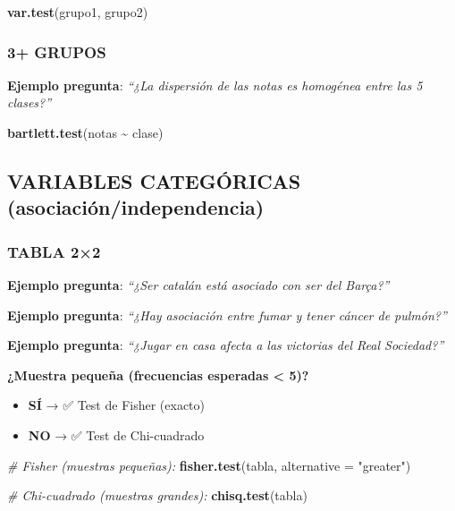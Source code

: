\documentclass[
  10pt,
]{article}
\newenvironment{Shaded}{\begin{snugshade}}{\end{snugshade}}
\newcommand{\AttributeTok}[1]{\textcolor[rgb]{0.13,0.29,0.53}{#1}}
\newcommand{\CommentTok}[1]{\textcolor[rgb]{0.56,0.35,0.01}{\textit{#1}}}
\newcommand{\FunctionTok}[1]{\textcolor[rgb]{0.13,0.29,0.53}{\textbf{#1}}}
\newcommand{\NormalTok}[1]{#1}
\newcommand{\SpecialCharTok}[1]{\textcolor[rgb]{0.81,0.36,0.00}{\textbf{#1}}}
\newcommand{\StringTok}[1]{\textcolor[rgb]{0.31,0.60,0.02}{#1}}
\providecommand{\tightlist}{%
  \setlength{\itemsep}{0pt}\setlength{\parskip}{0pt}}
\begin{document}
\begin{Shaded}
\begin{Highlighting}[]
\FunctionTok{var.test}\NormalTok{(grupo1, grupo2)}
\end{Highlighting}
\end{Shaded}

\subsubsection{3+ GRUPOS}\label{grupos-1}

\textbf{Ejemplo pregunta}: \emph{``¿La dispersión de las notas es
homogénea entre las 5 clases?''}

\begin{Shaded}
\begin{Highlighting}[]
\FunctionTok{bartlett.test}\NormalTok{(notas }\SpecialCharTok{\textasciitilde{}}\NormalTok{ clase)}
\end{Highlighting}
\end{Shaded}

\subsection{VARIABLES CATEGÓRICAS
(asociación/independencia)}\label{variables-categuxf3ricas-asociaciuxf3nindependencia}

\subsubsection{TABLA 2×2}\label{tabla-22}

\textbf{Ejemplo pregunta}: \emph{``¿Ser catalán está asociado con ser
del Barça?''}

\textbf{Ejemplo pregunta}: \emph{``¿Hay asociación entre fumar y tener
cáncer de pulmón?''}

\textbf{Ejemplo pregunta}: \emph{``¿Jugar en casa afecta a las victorias
del Real Sociedad?''}

\textbf{¿Muestra pequeña (frecuencias esperadas \textless{} 5)?}

\begin{itemize}
\tightlist
\item
  \textbf{SÍ} → ✅ Test de Fisher (exacto)
\item
  \textbf{NO} → ✅ Test de Chi-cuadrado
\end{itemize}

\begin{Shaded}
\begin{Highlighting}[]
\CommentTok{\# Fisher (muestras pequeñas):}
\FunctionTok{fisher.test}\NormalTok{(tabla, }\AttributeTok{alternative =} \StringTok{"greater"}\NormalTok{)}

\CommentTok{\# Chi{-}cuadrado (muestras grandes):}
\FunctionTok{chisq.test}\NormalTok{(tabla)}
\end{Highlighting}
\end{Shaded}
\end{document}

